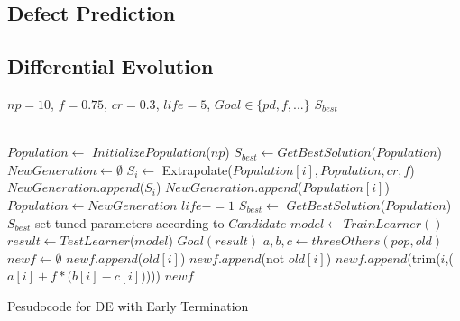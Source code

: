 \documentclass[12pt, journal, compsoc]{IEEEtran}
\begin{document}
\subsection{Defect Prediction}
\subsection{Differential Evolution}
\begin{algorithm}[htbp!]
  
  \scriptsize
  \begin{algorithmic}[1]
    \Require $\mathit{np} = 10$, $f=0.75$, $cr=0.3$, $\mathit{life} = 5$, $\mathit{Goal} \in \{\mathit{pd},f,...\}$
    \Ensure $S_{best}$
    
    ~\\
    \State $Population  \gets $ $InitializePopulation$($\mathit{np}$)   
    \State $S_{best} \gets $$GetBestSolution$($Population $)
    \State $NewGeneration \gets \emptyset$
    \State $S_i \gets$ Extrapolate($Population [i], Population , cr, f$)
    \State $NewGeneration$.$append$($S_i$)
    \Else
    \State $NewGeneration$.$append$($Population [i]$)
    \EndIf
    \EndFor
    \State $Population  \gets NewGeneration$
    \State $life -=1$
    \EndIf
    \State $S_{best} \gets$ $GetBestSolution$($Population $)
    \EndWhile
    \State \Return $S_{best}$
    \EndFunction
    \State set tuned parameters according to $Candidate$
    \State $model \gets$$TrainLearner()$
    \State $result \gets$$TestLearner$($model$)   
    \State \Return$\mathit{Goal}(result)$  
    \EndFunction
    \State $a, b, c\gets threeOthers(pop,old)$  
    \State $newf \gets \emptyset$
    \State $newf$.$append$($old[i]$)
    \Else
    \State $newf$.$append$(not $old[i]$)
    \Else
    \State $newf$.$append$(trim($i$,($a[i] + f * (b[i] - c[i]$)))) 
    \EndIf
    \EndIf
    \EndFor
    \State \Return $newf$
    \EndFunction
  \end{algorithmic} 
  \caption{Pesudocode for DE with Early Termination}
  \label{alg:DE}
\end{algorithm}
\end{document}
